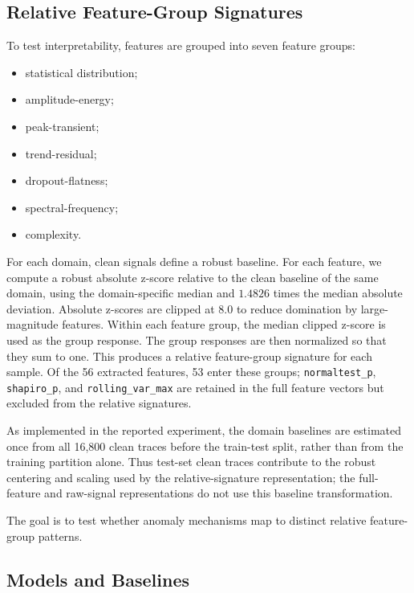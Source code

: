 \subsection{Relative Feature-Group Signatures}

To test interpretability, features are grouped into seven feature groups:

\begin{itemize}
    \item statistical distribution;
    \item amplitude-energy;
    \item peak-transient;
    \item trend-residual;
    \item dropout-flatness;
    \item spectral-frequency;
    \item complexity.
\end{itemize}

For each domain, clean signals define a robust baseline. For each feature, we compute a robust absolute z-score relative to the clean baseline of the same domain, using the domain-specific median and \(1.4826\) times the median absolute deviation. Absolute z-scores are clipped at 8.0 to reduce domination by large-magnitude features. Within each feature group, the median clipped z-score is used as the group response. The group responses are then normalized so that they sum to one. This produces a relative feature-group signature for each sample. Of the 56 extracted features, 53 enter these groups; \texttt{normaltest\_p}, \texttt{shapiro\_p}, and \texttt{rolling\_var\_max} are retained in the full feature vectors but excluded from the relative signatures.

As implemented in the reported experiment, the domain baselines are estimated once from all 16,800 clean traces before the train-test split, rather than from the training partition alone. Thus test-set clean traces contribute to the robust centering and scaling used by the relative-signature representation; the full-feature and raw-signal representations do not use this baseline transformation.

The goal is to test whether anomaly mechanisms map to distinct relative feature-group patterns.

\subsection{Models and Baselines}

